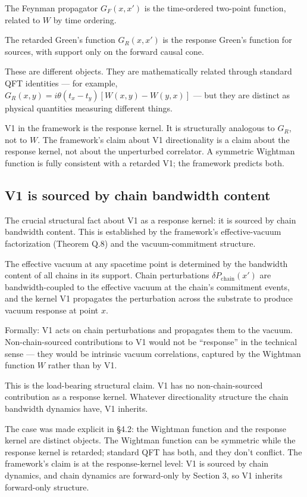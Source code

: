 \documentclass[11pt,a4paper]{article}
\begin{document}
The Feynman propagator $G_F(x, x')$ is the time-ordered two-point function, related to $W$ by time ordering.

The retarded Green's function $G_R(x, x')$ is the response Green's function for sources, with support only on the forward causal cone.

These are different objects. They are mathematically related through standard QFT identities --- for example, $G_R(x, y) = i \theta(t_x - t_y) [W(x, y) - W(y, x)]$ --- but they are distinct as physical quantities measuring different things.

V1 in the framework is the response kernel. It is structurally analogous to $G_R$, not to $W$. The framework's claim about V1 directionality is a claim about the response kernel, not about the unperturbed correlator. A symmetric Wightman function is fully consistent with a retarded V1; the framework predicts both.

\subsection{V1 is sourced by chain bandwidth content}

The crucial structural fact about V1 as a response kernel: it is sourced by chain bandwidth content. This is established by the framework's effective-vacuum factorization (Theorem Q.8) and the vacuum-commitment structure.

The effective vacuum at any spacetime point is determined by the bandwidth content of all chains in its support. Chain perturbations $\delta P_{\mathrm{chain}}(x')$ are bandwidth-coupled to the effective vacuum at the chain's commitment events, and the kernel V1 propagates the perturbation across the substrate to produce vacuum response at point $x$.

Formally: V1 acts on chain perturbations and propagates them to the vacuum. Non-chain-sourced contributions to V1 would not be ``response'' in the technical sense --- they would be intrinsic vacuum correlations, captured by the Wightman function $W$ rather than by V1.

This is the load-bearing structural claim. V1 has no non-chain-sourced contribution as a response kernel. Whatever directionality structure the chain bandwidth dynamics have, V1 inherits.

The case was made explicit in \S4.2: the Wightman function and the response kernel are distinct objects. The Wightman function can be symmetric while the response kernel is retarded; standard QFT has both, and they don't conflict. The framework's claim is at the response-kernel level: V1 is sourced by chain dynamics, and chain dynamics are forward-only by Section 3, so V1 inherits forward-only structure.
\end{document}
